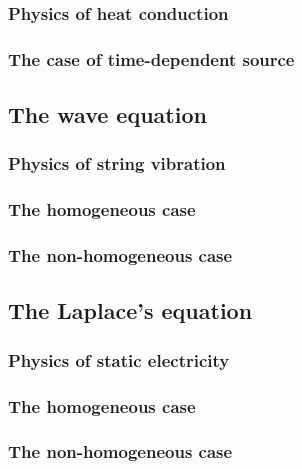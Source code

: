 \subsubsection{Physics of heat conduction}

\subsubsection{The case of time-dependent source}

\subsection{The wave equation}

\subsubsection{Physics of string vibration}

\subsubsection{The homogeneous case}

\subsubsection{The non-homogeneous case}


\subsection{The Laplace's equation}

\subsubsection{Physics of static electricity}

\subsubsection{The homogeneous case}

\subsubsection{The non-homogeneous case}